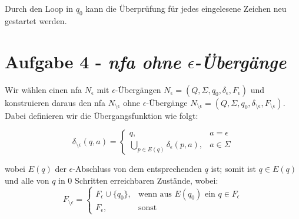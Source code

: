 \documentclass{article}
\begin{document}
	Durch den Loop in $q_0$ kann die Überprüfung für jedes eingelesene Zeichen neu gestartet werden.
	
\section*{Aufgabe 4 - \textit{nfa ohne $\epsilon$-Übergänge}}

Wir wählen einen nfa $N_\epsilon$ mit $\epsilon$-Übergängen $N_\epsilon = (Q,\Sigma,q_0,\delta_\epsilon,F_\epsilon)$ und konstruieren daraus den nfa $N_{\setminus\epsilon}$ ohne $\epsilon$-Übergänge $N_{\setminus\epsilon} = (Q,\Sigma,q_0,\delta_{\setminus\epsilon},F_{\setminus\epsilon})$. Dabei definieren wir die Übergangsfunktion wie folgt:

\begin{equation}
	\delta_{\setminus\epsilon}(q,a) = \begin{cases}
		q, &a = \epsilon\\
		\bigcup_{p \in E(q)}\delta_\epsilon(p,a), &a \in \Sigma
	\end{cases}
\end{equation}

wobei $E(q)$ der $\epsilon$-Abschluss von dem entsprechenden $q$ ist; somit ist $q \in E(q)$ und alle von $q$ in 0 Schritten erreichbaren Zustände, wobei:
\begin{equation}
	F_{\setminus\epsilon} = \begin{cases}
	F_\epsilon \cup \{q_0\}, &\text{wenn aus } E(q_0) \text{ ein } q \in F_\epsilon   \\ F_\epsilon, &\text{sonst}
	\end{cases}
\end{equation}
\end{document}
